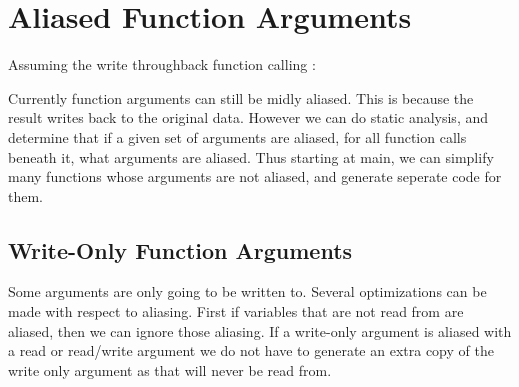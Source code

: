 \section{Aliased Function Arguments}
Assuming the write through\/back function calling : 

Currently function arguments can still be midly aliased.
    This is because the result writes back to the original data.
    However we can do static analysis, and determine that if a given set of arguments are aliased, for all function calls beneath it, what arguments are aliased.
    Thus starting at main, we can simplify many functions whose arguments are not aliased, and generate seperate code for them.

\subsection{Write-Only Function Arguments}
Some arguments are only going to be written to.
    Several optimizations can be made with respect to aliasing.
    First if variables that are not read from are aliased, then we can ignore those aliasing.
    If a write-only argument is aliased with a read or read/write argument we do not have to generate an extra copy of the write only argument as that will never be read from.

